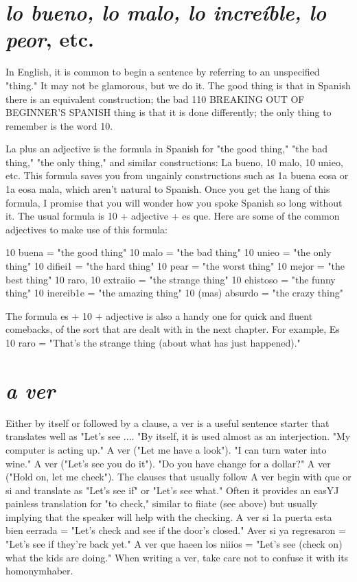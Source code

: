 \section{\emph{lo bueno, lo malo, lo increíble, lo peor}, etc.}

In English, it is common to begin a sentence by referring to an
unspecified "thing." It may not be glamorous, but we do it. The good
thing is that in Spanish there is an equivalent construction; the bad
110 BREAKING OUT OF BEGINNER'S SPANISH
thing is that it is done differently; the only thing to remember is the
word 10.

La plus an adjective is the formula in Spanish for "the good
thing," "the bad thing," "the only thing," and similar constructions:
La bueno, 10 malo, 10 unieo, etc. This formula saves you from ungainly constructions such as 1a buena eosa or 1a eosa mala, which
aren't natural to Spanish. Once you get the hang of this formula, I
promise that you will wonder how you spoke Spanish so long without
it. The usual formula is 10 + adjective + es que. Here are some of the
common adjectives to make use of this formula:

\bsk

10 buena = "the good thing"
10 malo = "the bad thing"
10 unieo = "the only thing"
10 difiei1 = "the hard thing"
10 pear = "the worst thing"
10 mejor = "the best thing"
10 raro, 10 extraiio = "the strange thing"
10 ehistoso = "the funny thing"
10 inereib1e = "the amazing thing"
10 (mas) absurdo = "the crazy thing"

\bsk

The formula es + 10 + adjective is also a handy one for quick and
fluent comebacks, of the sort that are dealt with in the next chapter.
For example, Es 10 raro = "That's the strange thing (about what has
just happened)."

\section{\emph{a ver}}

Either by itself or followed by a clause, a ver is a useful sentence starter that translates well as "Let's see .... "By itself, it is used
almost as an interjection. "My computer is acting up." A ver ("Let
me have a look"). "I can turn water into wine." A ver ("Let's see you
do it"). "Do you have change for a dollar?" A ver ("Hold on, let me
check"). The clauses that usually follow A ver begin with que or si
and translate as "Let's see if" or "Let's see what." Often it provides an
easYJ painless translation for "to check," similar to fiiate (see above)
but usually implying that the speaker will help with the checking. A
ver si 1a puerta esta bien eerrada = "Let's check and see if the door's
closed." Aver si ya regresaron = "Let's see if they're back yet." A
ver que haeen los niiios = "Let's see (check on) what the kids are doing." When writing a ver, take care not to confuse it with its homonymhaber.

